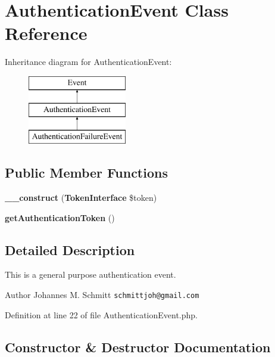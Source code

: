 \section{Authentication\+Event Class Reference}
\label{class_symfony_1_1_component_1_1_security_1_1_core_1_1_event_1_1_authentication_event}
Inheritance diagram for Authentication\+Event\+:\begin{figure}[H]
\begin{center}
\leavevmode
\includegraphics[height=3.000000cm]{class_symfony_1_1_component_1_1_security_1_1_core_1_1_event_1_1_authentication_event}
\end{center}
\end{figure}
\subsection*{Public Member Functions}
\begin{DoxyCompactItemize}
\item 
{\bf \+\_\+\+\_\+construct} ({\bf Token\+Interface} \$token)
\item 
{\bf get\+Authentication\+Token} ()
\end{DoxyCompactItemize}


\subsection{Detailed Description}
This is a general purpose authentication event.

\begin{DoxyAuthor}{Author}
Johannes M. Schmitt {\tt schmittjoh@gmail.\+com} 
\end{DoxyAuthor}


Definition at line 22 of file Authentication\+Event.\+php.



\subsection{Constructor \& Destructor Documentation}
